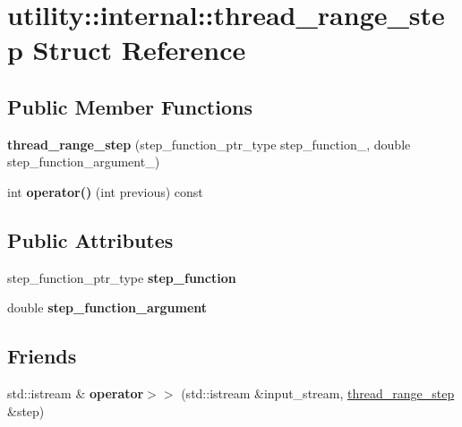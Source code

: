 \hypertarget{structutility_1_1internal_1_1thread__range__step}{}\section{utility\+:\+:internal\+:\+:thread\+\_\+range\+\_\+step Struct Reference}
\label{structutility_1_1internal_1_1thread__range__step}
\subsection*{Public Member Functions}
\begin{DoxyCompactItemize}
\item 
\hypertarget{structutility_1_1internal_1_1thread__range__step_a4fbd1a328b3ed71fa141d589c46887a0}{}{\bfseries thread\+\_\+range\+\_\+step} (step\+\_\+function\+\_\+ptr\+\_\+type step\+\_\+function\+\_\+, double step\+\_\+function\+\_\+argument\+\_\+)\label{structutility_1_1internal_1_1thread__range__step_a4fbd1a328b3ed71fa141d589c46887a0}

\item 
\hypertarget{structutility_1_1internal_1_1thread__range__step_a6a892e6bc73bcc7f853c40b347a64206}{}int {\bfseries operator()} (int previous) const \label{structutility_1_1internal_1_1thread__range__step_a6a892e6bc73bcc7f853c40b347a64206}

\end{DoxyCompactItemize}
\subsection*{Public Attributes}
\begin{DoxyCompactItemize}
\item 
\hypertarget{structutility_1_1internal_1_1thread__range__step_acab0dda7403edb35deb54b7efed1876b}{}step\+\_\+function\+\_\+ptr\+\_\+type {\bfseries step\+\_\+function}\label{structutility_1_1internal_1_1thread__range__step_acab0dda7403edb35deb54b7efed1876b}

\item 
\hypertarget{structutility_1_1internal_1_1thread__range__step_aa1c534bb844cbbde267f619371fb18f5}{}double {\bfseries step\+\_\+function\+\_\+argument}\label{structutility_1_1internal_1_1thread__range__step_aa1c534bb844cbbde267f619371fb18f5}

\end{DoxyCompactItemize}
\subsection*{Friends}
\begin{DoxyCompactItemize}
\item 
\hypertarget{structutility_1_1internal_1_1thread__range__step_afdfc23e0c8e8e4c7d23a9fe72823589e}{}std\+::istream \& {\bfseries operator$>$$>$} (std\+::istream \&input\+\_\+stream, \hyperlink{structutility_1_1internal_1_1thread__range__step}{thread\+\_\+range\+\_\+step} \&step)\label{structutility_1_1internal_1_1thread__range__step_afdfc23e0c8e8e4c7d23a9fe72823589e}

\end{DoxyCompactItemize}


